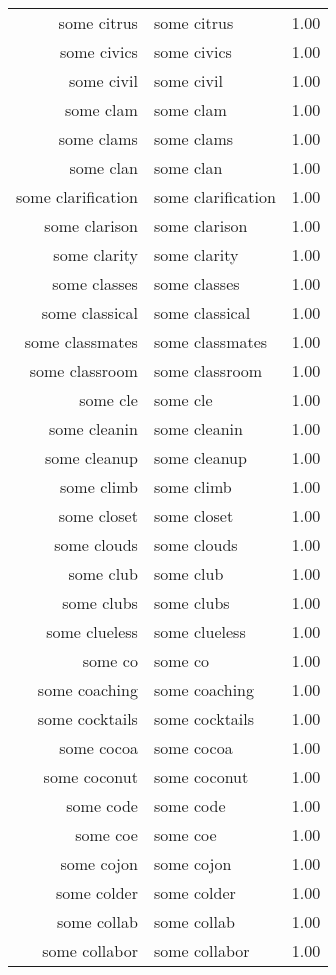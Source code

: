 \begin{table}[ht]
\begin{tabular}{rlr}
  some citrus & some citrus & 1.00 \\ 
  some civics & some civics & 1.00 \\ 
  some civil & some civil & 1.00 \\ 
  some clam & some clam & 1.00 \\ 
  some clams & some clams & 1.00 \\ 
  some clan & some clan & 1.00 \\ 
  some clarification & some clarification & 1.00 \\ 
  some clarison & some clarison & 1.00 \\ 
  some clarity & some clarity & 1.00 \\ 
  some classes & some classes & 1.00 \\ 
  some classical & some classical & 1.00 \\ 
  some classmates & some classmates & 1.00 \\ 
  some classroom & some classroom & 1.00 \\ 
  some cle & some cle & 1.00 \\ 
  some cleanin & some cleanin & 1.00 \\ 
  some cleanup & some cleanup & 1.00 \\ 
  some climb & some climb & 1.00 \\ 
  some closet & some closet & 1.00 \\ 
  some clouds & some clouds & 1.00 \\ 
  some club & some club & 1.00 \\ 
  some clubs & some clubs & 1.00 \\ 
  some clueless & some clueless & 1.00 \\ 
  some co & some co & 1.00 \\ 
  some coaching & some coaching & 1.00 \\ 
  some cocktails & some cocktails & 1.00 \\ 
  some cocoa & some cocoa & 1.00 \\ 
  some coconut & some coconut & 1.00 \\ 
  some code & some code & 1.00 \\ 
  some coe & some coe & 1.00 \\ 
  some cojon & some cojon & 1.00 \\ 
  some colder & some colder & 1.00 \\ 
  some collab & some collab & 1.00 \\ 
  some collabor & some collabor & 1.00 \\ 

\end{tabular}
\end{table}
